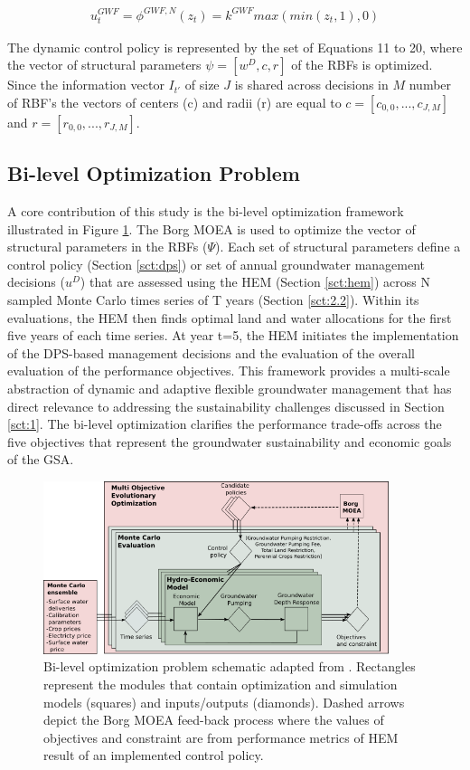\documentclass[a4paper,fleqn]{cas-sc}
\begin{document}
\begin{align}\label{eq:20}
u^{GWF}_t = \phi^{GWF,N}(z_{t}) = k^{GWF}max(min(z_{t},1),0)
\end{align}

The dynamic control policy is represented by the set of Equations 11 to 20, where the vector of structural parameters $\psi = [w^{D},c,r]$ of the RBFs is optimized. Since the information vector $I_{t'}$ of size $J$ is shared across decisions in $M$ number of RBF's the vectors of centers (c) and radii (r) are equal to $c=[c_{0,0},...,c_{J,M}]$ and $r=[r_{0,0},...,r_{J,M}]$.


\subsection{Bi-level Optimization Problem}\label{sct:3.2}

A core contribution of this study is the bi-level optimization framework illustrated in Figure \ref{fig:4}. The Borg MOEA \citep{hadka_borg_2013,gupta_can_2020} is used to optimize the vector of structural parameters in the RBFs ($\Psi$). Each set of structural parameters define a control policy (Section \ref{sct:dps}) or set of annual groundwater management decisions ($u^{D}$) that are assessed using the HEM (Section \ref{sct:hem}) across N sampled Monte Carlo times series of T years (Section \ref{sct:2.2}). Within its evaluations, the HEM then finds optimal land and water allocations for the first five years of each time series. At year t=5, the HEM initiates the implementation of the DPS-based management decisions and the evaluation of the overall evaluation of the performance objectives. This framework provides a multi-scale abstraction of dynamic and adaptive flexible groundwater management that has direct relevance to addressing the sustainability challenges discussed in Section \ref{sct:1}. The bi-level optimization clarifies the performance trade-offs across the five objectives that represent the groundwater sustainability and economic goals of the GSA. 

\clearpage
\begin{figure}[pos=hbt!]
    \includegraphics[width=0.9\textwidth,center]{Diagram2}
    \caption{Bi-level optimization problem schematic adapted from \citet{hamilton_stream_2022}. Rectangles represent the modules that contain optimization and simulation models (squares) and inputs/outputs (diamonds). Dashed arrows depict the Borg MOEA feed-back process where the values of objectives and constraint are from performance metrics of HEM result of an implemented control policy.}
    \label{fig:4}
\end{figure}
\end{document}
